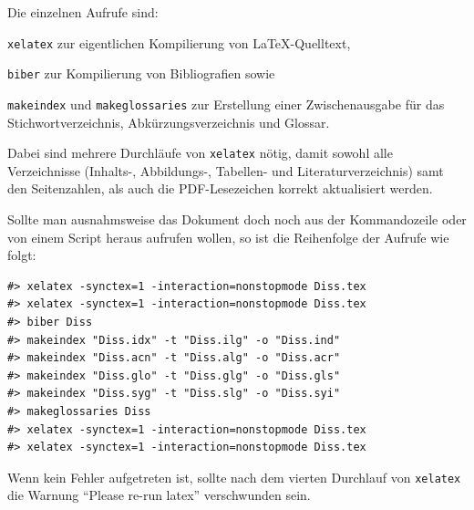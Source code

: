 Die einzelnen Aufrufe sind:
\begin{itemize*}
\item {}\texttt{xelatex} zur eigentlichen Kompilierung von \LaTeX-Quelltext,
\item {}\texttt{biber} zur Kompilierung von Bibliografien sowie
\item {}\texttt{makeindex} und \texttt{makeglossaries}
zur Erstellung einer Zwischenausgabe für das Stichwortverzeichnis,
Abkürzungsverzeichnis und Glossar.
\end{itemize*}
Dabei sind mehrere Durchläufe von \texttt{xelatex} nötig,
damit sowohl alle Verzeichnisse
(Inhalts-, Abbildungs-, Tabellen- und Literaturverzeichnis)
samt den Seitenzahlen,
als auch die PDF-Lesezeichen korrekt aktualisiert werden.

Sollte man ausnahmsweise das Dokument doch noch aus der Kommandozeile oder von einem Script heraus aufrufen wollen,
so ist die Reihenfolge der Aufrufe wie folgt:
\begin{verbatim}
#> xelatex -synctex=1 -interaction=nonstopmode Diss.tex
#> xelatex -synctex=1 -interaction=nonstopmode Diss.tex
#> biber Diss
#> makeindex "Diss.idx" -t "Diss.ilg" -o "Diss.ind"
#> makeindex "Diss.acn" -t "Diss.alg" -o "Diss.acr"
#> makeindex "Diss.glo" -t "Diss.glg" -o "Diss.gls"
#> makeindex "Diss.syg" -t "Diss.slg" -o "Diss.syi"
#> makeglossaries Diss
#> xelatex -synctex=1 -interaction=nonstopmode Diss.tex
#> xelatex -synctex=1 -interaction=nonstopmode Diss.tex
\end{verbatim}

Wenn kein Fehler aufgetreten ist,
sollte nach dem vierten Durchlauf von \texttt{xelatex} die
Warnung \enquote{Please re-run latex}
verschwunden sein.